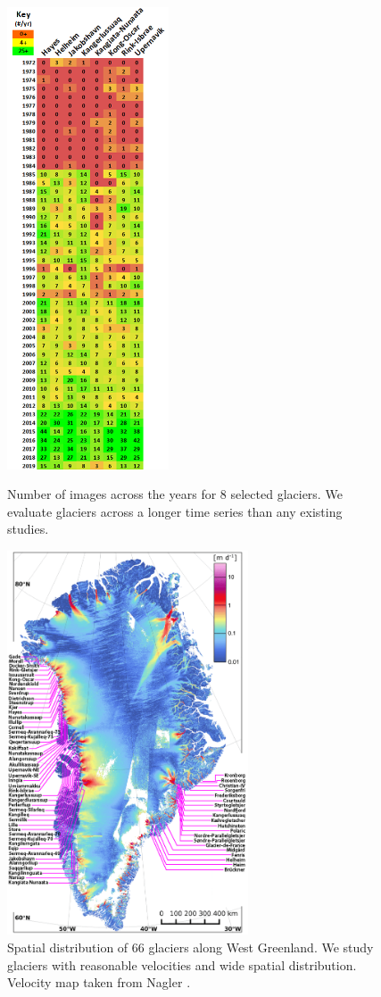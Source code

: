 \documentclass[tc, manuscript]{copernicus}
\begin{document}
\begin{figure}
    \noindent
    \begin{minipage}{4.8cm}
        \includegraphics[width=4.8cm]{temporal.png}
        \caption{Number of images across the years for 8 selected glaciers. We evaluate glaciers across a longer time series than any existing studies.}
    \end{minipage}
    \hspace{0.15cm}
    \begin{minipage}{7.15cm}
        \centering
        \includegraphics[width=7.15cm]{spatial_66.png}
        \caption{Spatial distribution of 66 glaciers along West Greenland. We study glaciers with reasonable velocities and wide spatial distribution. Velocity map taken from Nagler \citep{nagler2015}.}
    \end{minipage}
\end{figure}
\end{document}
